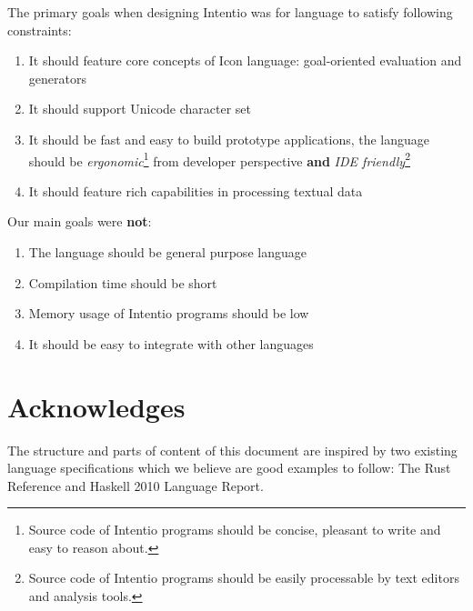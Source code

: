 The primary goals when designing Intentio was for language to satisfy following constraints:
\begin{enumerate}
  \item It should feature core concepts of Icon language: goal-oriented evaluation and generators
  \item It should support Unicode character set
  \item It should be fast and easy to build prototype applications, the language should be \emph{ergonomic}\footnote{Source code of Intentio programs should be concise, pleasant to write and easy to reason about.} from developer perspective \textbf{and} \emph{IDE friendly}\footnote{Source code of Intentio programs should be easily processable by text editors and analysis tools.}
  \item It should feature rich capabilities in processing textual data
\end{enumerate}

Our main goals were \textbf{not}:
\begin{enumerate}
  \item The language should be general purpose language
  \item Compilation time should be short
  \item Memory usage of Intentio programs should be low
  \item It should be easy to integrate with other languages
\end{enumerate}

\section*{Acknowledges}

The structure and parts of content of this document are inspired by two existing language specifications which we believe are good examples to follow: The Rust Reference\cite{TheRustReference} and Haskell 2010 Language Report\cite{Marlow_haskell2010}.
